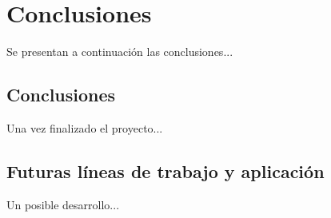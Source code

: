 \chapter{Conclusiones}

Se presentan a continuación las conclusiones...

\section{Conclusiones}

Una vez finalizado el proyecto...

\section{Futuras líneas de trabajo y aplicación}

Un posible desarrollo...